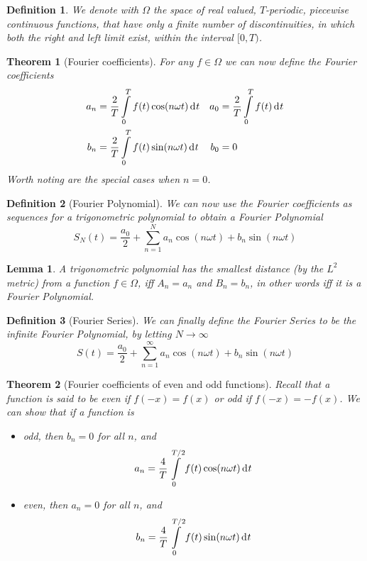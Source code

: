 \documentclass[twocolumn, margin=small]{tex/hsrzf}
\theoremstyle{komfourzf}
\newtheorem{theorem}{Theorem}
\newtheorem{definition}{Definition}
\newtheorem{lemma}{Lemma}
\begin{document}
\begin{definition}
  We denote with \(\Omega\) the space of real valued, \(T\)-periodic, piecewise continuous functions, that have only a finite number of discontinuities, in which both the right and left limit exist, within the interval \([0,T)\).
\end{definition}

\begin{theorem}[Fourier coefficients]
  For any \(f\in\Omega\) we can now define the \emph{Fourier coefficients}
  \begin{align*}
    a_n &= \frac{2}{T}\int\limits_0^T f(t)\cos(n\omega t)\,\mathrm{d}^{} t & a_0 &= \frac{2}{T}\int\limits_0^T f(t)\,\mathrm{d}^{} t \\
    b_n &= \frac{2}{T}\int\limits_0^T f(t)\sin(n\omega t)\,\mathrm{d}^{} t & b_0 &= 0
  \end{align*}
  Worth noting are the special cases when \(n=0\).
\end{theorem}

\begin{definition}[Fourier Polynomial]
  We can now use the Fourier coefficients as sequences for a trigonometric polynomial to obtain a \emph{Fourier Polynomial}
  \[
    S_N(t) = \frac{a_0}{2} + \sum_{n=1}^N a_n\cos(n\omega t) + b_n\sin(n\omega t)
  \]
\end{definition}

\begin{lemma}
  A trigonometric polynomial has the smallest distance (by the \(L^2\) metric) from a function \(f\in\Omega\), iff \(A_n = a_n\) and \(B_n = b_n\), in other words iff it is a Fourier Polynomial.
\end{lemma}

\begin{definition}[Fourier Series]
  We can finally define the \emph{Fourier Series} to be the infinite Fourier Polynomial, by letting \(N\to\infty\)
  \[
    S(t) = \frac{a_0}{2} + \sum_{n=1}^\infty a_n\cos(n\omega t) + b_n\sin(n\omega t)
  \]
\end{definition}

\begin{theorem}[Fourier coefficients of even and odd functions]
  Recall that a function is said to be \emph{even} if \(f(-x) = f(x)\) or \emph{odd} if \(f(-x) = -f(x)\). We can show that if a function is
  \begin{itemize}
    \item odd, then \(b_n = 0\) for all \(n\), and
      \[
        a_n = \frac{4}{T}\int\limits_0^{T/2} f(t)\cos(n\omega t)\,\mathrm{d}^{} t
      \]
    \item even, then \(a_n = 0\) for all \(n\), and
      \[
        b_n = \frac{4}{T}\int\limits_0^{T/2} f(t)\sin(n\omega t)\,\mathrm{d}^{} t
      \]
  \end{itemize}
\end{theorem}
\end{document}
